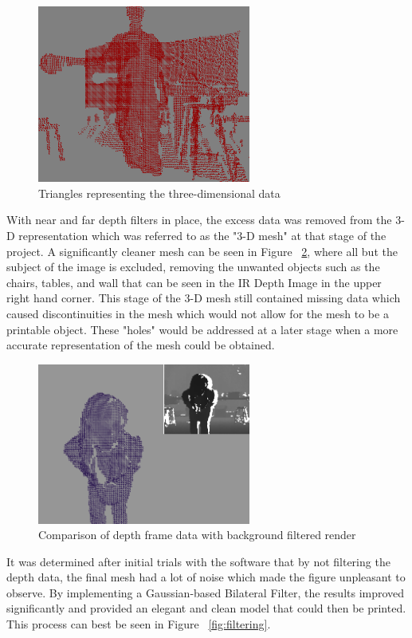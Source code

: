\documentclass[pdftex,10.5pt]{report}
\begin{document}
\begin{figure}[H]
	\centering
	\includegraphics[width=70mm]{figures/3dtriangles.png}
	\caption{Triangles representing the three-dimensional data}
	\label{3dtri}
\end{figure}

With near and far depth filters in place, the excess data was removed from the 3-D representation which was referred to as the "3-D mesh" at that stage of the project. A significantly cleaner mesh can be seen in Figure ~\ref{balls2}, where all but the subject of the image is excluded, removing the unwanted objects such as the chairs, tables, and wall that can be seen in the IR Depth Image in the upper right hand corner. This stage of the 3-D mesh still contained missing data which caused discontinuities in the mesh which would not allow for the mesh to be a printable object. These "holes" would be addressed at a later stage when a more accurate representation of the mesh could be obtained.
\begin{figure}[H]
	\centering
	\includegraphics[width=70mm]{figures/cadyholdingball2.png}
	\caption{Comparison of depth frame data with background filtered render}
	\label{balls2}
\end{figure}

It was determined after initial trials with the software that by not filtering the depth data, the final mesh had a lot of noise which made the figure unpleasant to observe. By implementing a Gaussian-based Bilateral Filter, the results improved significantly and provided an elegant and clean model that could then be printed. This process can best be seen in Figure ~\ref{fig:filtering}.
\end{document}
